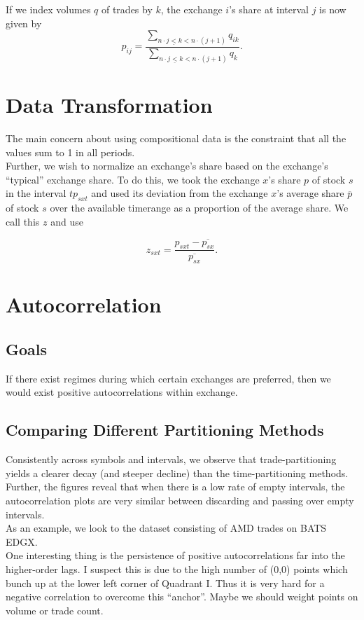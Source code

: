 \documentclass{article}
\begin{document}
If we index volumes $q$ of trades by $k$, the exchange $i$'s share at interval $j$ is now given by
$$p_{ij} = \frac{\sum_{n \cdot j \underline{<} k < n \cdot (j+1)} q_{ik}}{\sum_{n \cdot j \underline{<} k < n \cdot (j+1)}q_{k}}.$$

\section{Data Transformation}
The main concern about using compositional data is the constraint that all the values sum to 1 in all periods.\\

Further, we wish to normalize an exchange's share based on the exchange's ``typical'' exchange share. To do this, we took the exchange $x$'s share $p$ of stock $s$ in the interval $t$$p_{sxt}$ and used its deviation from the exchange $x$'s average share $\overline{p}$ of stock $s$ over the available timerange as a proportion of the average share. We call this $z$ and use

$$z_{sxt} = \frac{p_{sxt} - \overline{p_{sx}}}{\overline{p_{sx}}}.$$

\section{Autocorrelation}
\subsection{Goals}
If there exist regimes during which certain exchanges are preferred, then we would exist positive autocorrelations within exchange.\\

\subsection{Comparing Different Partitioning Methods}
Consistently across symbols and intervals, we observe that trade-partitioning yields a clearer decay (and steeper decline) than the time-partitioning methods. Further, the figures reveal that when there is a low rate of empty intervals, the autocorrelation plots are very similar between discarding and passing over empty intervals.\\

As an example, we look to the dataset consisting of AMD trades on BATS EDGX.\\

One interesting thing is the persistence of positive autocorrelations far into the higher-order lags. I suspect this is due to the high number of (0,0) points which bunch up at the lower left corner of Quadrant I. Thus it is very hard for a negative correlation to overcome this ``anchor''. Maybe we should weight points on volume or trade count.
\end{document}
